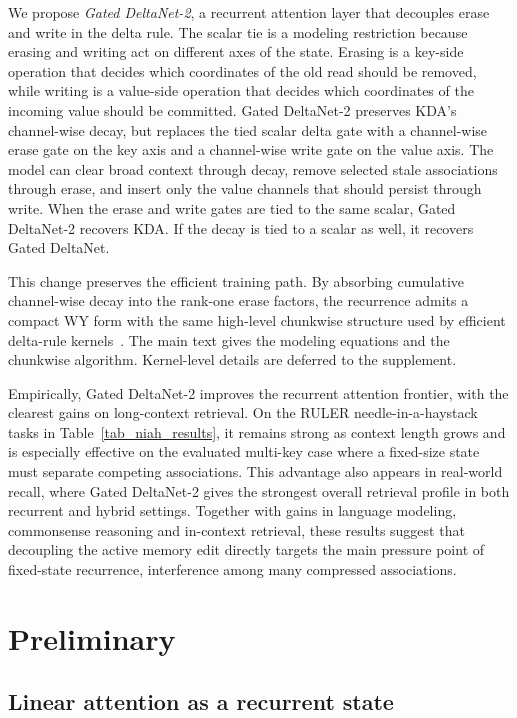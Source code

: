 \documentclass[10pt, logo, onecolumn, copyright]{nv}
\begin{document}
We propose \emph{Gated DeltaNet-2}, a recurrent attention layer that decouples erase and write in the delta rule. The scalar tie is a modeling restriction because erasing and writing act on different axes of the state. Erasing is a key-side operation that decides which coordinates of the old read should be removed, while writing is a value-side operation that decides which coordinates of the incoming value should be committed. Gated DeltaNet-2 preserves KDA's channel-wise decay, but replaces the tied scalar delta gate with a channel-wise erase gate on the key axis and a channel-wise write gate on the value axis. The model can clear broad context through decay, remove selected stale associations through erase, and insert only the value channels that should persist through write. When the erase and write gates are tied to the same scalar, Gated DeltaNet-2 recovers KDA. If the decay is tied to a scalar as well, it recovers Gated DeltaNet.

This change preserves the efficient training path. By absorbing cumulative channel-wise decay into the rank-one erase factors, the recurrence admits a compact WY form with the same high-level chunkwise structure used by efficient delta-rule kernels~\citep{bischof_wy_1985,hua_transformer_2022,sun2023retentive,yang_gated_2023}. The main text gives the modeling equations and the chunkwise algorithm. Kernel-level details are deferred to the supplement.

Empirically, Gated DeltaNet-2 improves the recurrent attention frontier, with the clearest gains on long-context retrieval. On the RULER needle-in-a-haystack tasks in Table~\ref{tab_niah_results}, it remains strong as context length grows and is especially effective on the evaluated multi-key case where a fixed-size state must separate competing associations. This advantage also appears in real-world recall, where Gated DeltaNet-2 gives the strongest overall retrieval profile in both recurrent and hybrid settings. Together with gains in language modeling, commonsense reasoning and in-context retrieval, these results suggest that decoupling the active memory edit directly targets the main pressure point of fixed-state recurrence, interference among many compressed associations.


\section{Preliminary}
\label{sec_preliminary}

\subsection{Linear attention as a recurrent state}
\end{document}
